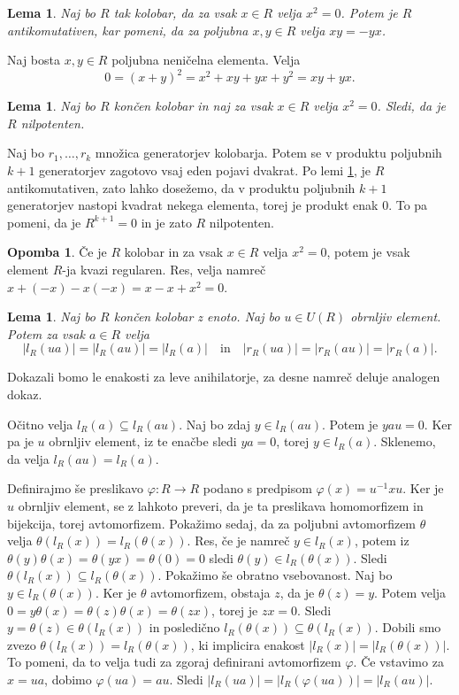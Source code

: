\documentclass[a4paper, 12pt]{amsart}
\theoremstyle{definition} %
\newtheorem{opomba}[definicija]{Opomba}
\theoremstyle{plain} %
\newtheorem{lema}[definicija]{Lema}
\begin{document}
\begin{lema}
\label{antikomutativnost}
Naj bo $R$ tak kolobar, da za vsak $x\in R$ velja $x^2 =0 $. Potem je $R$ antikomutativen, kar pomeni, da za poljubna $x,y\in R$ velja $xy = -yx$.
\end{lema}

\proof
Naj bosta $x,y\in R$ poljubna neničelna elementa. Velja 
$$
0 = (x+y)^2 = x^2 + xy + yx + y^2 = xy + yx.
$$ 
\endproof

\begin{lema}
\label{nilpotenten}
Naj bo $R$ končen kolobar in naj za vsak $x\in R$ velja $x^2 = 0$. Sledi, da je $R$ nilpotenten.
\end{lema}

\proof
Naj bo $r_1, \dots, r_k$ množica generatorjev kolobarja. Potem se v produktu poljubnih $k+1$ generatorjev zagotovo vsaj eden pojavi dvakrat. Po lemi \ref{antikomutativnost}, je $R$ antikomutativen, zato lahko dosežemo, da v produktu poljubnih $k+1$ generatorjev nastopi kvadrat nekega elementa, torej je produkt enak 0. To pa pomeni, da je $R^{k+1} = 0$ in je zato $R$ nilpotenten.  
\endproof

\begin{opomba}
Če je $R$ kolobar in za vsak $x\in R$ velja $x^2 = 0$, potem je vsak element $R$-ja kvazi regularen. Res, velja namreč $x+ (-x)  - x(-x) = x-x+x^2 = 0$.
\end{opomba}

\begin{lema}
\label{anihilatorProduktZObrnljivim}
Naj bo $R$ končen kolobar z enoto. Naj bo $u\in U(R)$ obrnljiv element. Potem za vsak $a\in R$ velja 
$$
|l_R(ua)| = |l_R(au)| = |l_R(a)| \quad \text{in}\quad |r_R(ua)| = |r_R(au)| = |r_R(a)|.
$$
\end{lema}

\proof
Dokazali bomo le enakosti za leve anihilatorje, za desne namreč deluje analogen dokaz. 

Očitno velja $l_R(a) \subseteq l_R(au)$. Naj bo zdaj $y\in l_R(au)$. Potem je $yau=0$. Ker pa je $u$ obrnljiv element, iz te enačbe sledi $ya = 0$, torej $y\in l_R(a)$. Sklenemo, da velja $l_R(au) = l_R(a)$.

Definirajmo še preslikavo $\varphi : R \rightarrow R$ podano s predpisom $\varphi(x) = u^{-1}xu$. Ker je $u$ obrnljiv element, se z lahkoto preveri, da je ta preslikava homomorfizem in bijekcija, torej avtomorfizem. Pokažimo sedaj, da za poljubni avtomorfizem $\theta$ velja $\theta(l_R(x)) = l_R(\theta(x))$. Res, če je namreč $y\in l_R(x)$, potem iz $\theta(y) \theta(x) = \theta(yx) = \theta(0) = 0$ sledi $\theta(y) \in l_R(\theta(x))$. Sledi $\theta(l_R(x)) \subseteq l_R(\theta(x))$. Pokažimo še obratno vsebovanost. Naj bo $y\in l_R(\theta(x))$. Ker je $\theta$ avtomorfizem, obstaja $z$, da je $\theta(z) = y$. Potem velja $0 = y\theta(x) = \theta(z) \theta(x)= \theta(zx)$, torej je $zx=0$. Sledi $y=\theta(z) \in \theta(l_R(x))$ in posledično $l_R(\theta(x)) \subseteq \theta(l_R(x))$. Dobili smo zvezo $\theta(l_R(x)) = l_R(\theta(x))$, ki implicira enakost $|l_R(x)| = |l_R(\theta(x))|$. To pomeni, da to velja tudi za zgoraj definirani avtomorfizem $\varphi$. Če vstavimo za $x= ua$, dobimo $\varphi(ua) = au$. Sledi $|l_R(ua)| =|l_R(\varphi(ua))| = |l_R(au)|$.
\endproof
\end{document}
